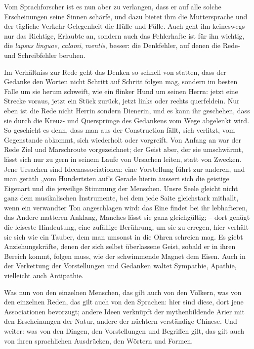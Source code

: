 Vom Sprachforscher ist es nun aber zu verlangen, dass er auf alle solche Erscheinungen seine Sinnen schärfe, und dazu bietet ihm die Muttersprache und der tägliche Verkehr Gelegenheit die Hülle und Fülle. Auch geht ihn keineswegs nur das Richtige, Erlaubte an, sondern auch das Fehlerhafte ist für ihn wichtig, die \textit{lapsus linguae}, \textit{calami}, \textit{mentis}, besser: die Denkfehler, auf denen die Rede- und Schreibfehler beruhen.

Im Verhältniss zur Rede geht das Denken so schnell von statten, dass der Gedanke den Worten nicht Schritt auf Schritt folgen mag, sondern im besten Falle um sie herum schweift, wie ein flinker Hund um seinen Herrn: jetzt eine Strecke voraus, jetzt ein Stück zurück, jetzt links oder rechts querfeldein. Nur eben ist die Rede nicht Herrin sondern Dienerin, und es kann ihr geschehen, dass sie durch die Kreuz- und Quersprünge des Gedankens vom Wege abgelenkt wird. So geschieht es denn, dass man aus der Construction fällt, sich verfitzt, vom Gegenstande abkommt, sich wiederholt oder vorgreift. Von Anfang an war der Rede Ziel und Marschroute vorgezeichnet; der Geist aber, der sie umschwärmt, lässt sich nur zu gern in seinem Laufe von Ursachen leiten, statt von Zwecken. Jene Ursachen sind Ideenassociationen: eine Vor\-\label{fp.44}stellung führt zur anderen, und man geräth „vom Hundertsten auf’s  Gerade hierin äussert sich die geistige Eigenart und die jeweilige Stimmung der Menschen. Unsre Seele gleicht \label{sp.44} nicht ganz dem musikalischen Instrumente, bei dem jede Saite gleichstark mithallt, wenn ein verwandter Ton angeschlagen wird: das Eine findet bei ihr lebhafteren, das Andere matteren Anklang, Manches lässt sie ganz gleichgültig; – dort genügt die leiseste Hindeutung, eine zufällige Berührung, um sie zu erregen, hier verhält sie sich wie ein Tauber, dem man umsonst in die Ohren schreien mag. Es giebt Anziehungskräfte, denen der sich selbst überlassene Geist, sobald er in ihren Bereich kommt, folgen muss, wie der schwimmende Magnet dem Eisen. Auch in der Verkettung der Vorstellungen und Gedanken waltet Sympathie, Apathie, vielleicht auch Antipathie.

Was nun von den einzelnen Menschen, das gilt auch von den Völkern, was von den einzelnen Reden, das gilt auch von den Sprachen: hier sind diese, dort jene Associationen bevorzugt; andere Ideen verknüpft der mythenbildende Arier mit den Erscheinungen der Natur, andere der nüchtern verständige Chinese. Und weiter: was von den Dingen, den Vorstellungen und Begriffen gilt, das gilt auch von ihren sprachlichen Ausdrücken, den Wörtern und Formen.

